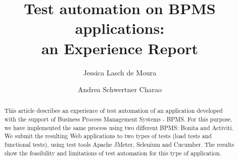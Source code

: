 \documentclass[runningheads,a4paper]{llncs}
\newcommand{\keywords}[1]{\par\addvspace\baselineskip
\noindent\keywordname\enspace\ignorespaces#1}
\begin{document}
\mainmatter  %

\title{
Test automation on BPMS applications: \\ an Experience Report}


%
%
\author{Jessica Lasch de Moura
\and Andrea Schwertner Charao}
%


%
%

\maketitle


\begin{abstract}
This article describes an experience of test automation of an application developed with the support of Business Process Management Systems - BPMS. For this purpose, we have implemented the same process using two different BPMS: Bonita and Activiti. We submit the resulting Web applications to two types of tests (load tests and functional tests), using test tools Apache JMeter, Selenium and Cucumber. The results show the feasibility and limitations of test automation for this type of application.

\end{abstract}
\end{document}
